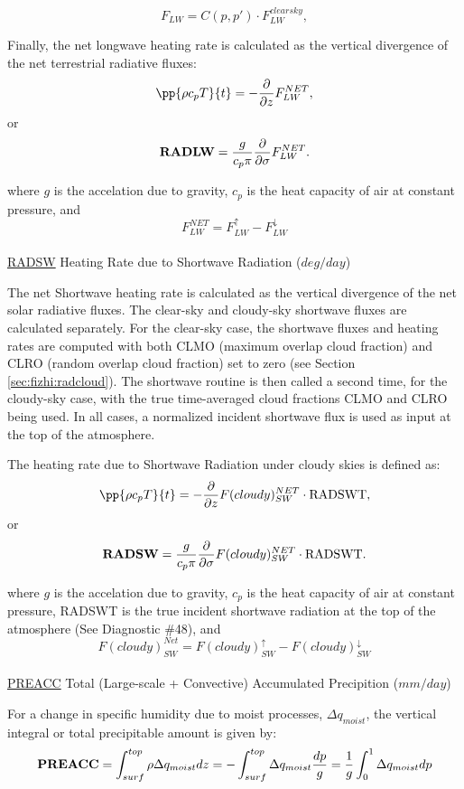 \noindent
\[
F_{LW} = C(p,p') \cdot F^{clearsky}_{LW},
\]

\noindent
Finally, the net longwave heating rate is calculated as the vertical divergence of the
net terrestrial radiative fluxes:
\[
\pp{\rho c_p T}{t} = - {\partial \over \partial z} F_{LW}^{NET} ,
\]
or
\[
{\bf RADLW} = \frac{g}{c_p \pi} {\partial \over \partial \sigma} F_{LW}^{NET} .
\]

\noindent
where $g$ is the accelation due to gravity,
$c_p$ is the heat capacity of air at constant pressure,
and
\[
F_{LW}^{NET} = F_{LW}^\uparrow - F_{LW}^\downarrow
\]
\\


\noindent
{ \underline {RADSW} Heating Rate due to Shortwave Radiation ($deg/day$) }

\noindent
The net Shortwave heating rate is calculated as the vertical divergence of the
net solar radiative fluxes.
The clear-sky and cloudy-sky shortwave fluxes are calculated separately.
For the clear-sky case, the shortwave fluxes and heating rates are computed with
both CLMO (maximum overlap cloud fraction) and
CLRO (random overlap cloud fraction) set to zero (see Section \ref{sec:fizhi:radcloud}).
The shortwave routine is then called a second time, for the cloudy-sky case, with the
true time-averaged cloud fractions CLMO
and CLRO being used.  In all cases, a normalized incident shortwave flux is used as
input at the top of the atmosphere.

\noindent
The heating rate due to Shortwave Radiation under cloudy skies is defined as:
\[
\pp{\rho c_p T}{t} = - {\partial \over \partial z} F(cloudy)_{SW}^{NET} \cdot {\rm RADSWT},
\]
or
\[
{\bf RADSW} = \frac{g}{c_p \pi} {\partial \over \partial \sigma} F(cloudy)_{SW}^{NET}\cdot {\rm RADSWT} .
\]

\noindent
where $g$ is the accelation due to gravity,
$c_p$ is the heat capacity of air at constant pressure, RADSWT is the true incident
shortwave radiation at the top of the atmosphere (See Diagnostic \#48), and
\[
F(cloudy)_{SW}^{Net} = F(cloudy)_{SW}^\uparrow - F(cloudy)_{SW}^\downarrow
\]
\\

\noindent
{ \underline {PREACC} Total (Large-scale + Convective) Accumulated Precipition ($mm/day$) } 

\noindent
For a change in specific humidity due to moist processes, $\Delta q_{moist}$, 
the vertical integral or total precipitable amount is given by:   
\[
{\bf PREACC} = \int_{surf}^{top} \rho \Delta q_{moist} dz = - \int_{surf}^{top} \Delta  q_{moist}
{dp \over g} = {1 \over g} \int_0^1 \Delta q_{moist} dp
\]
\\

